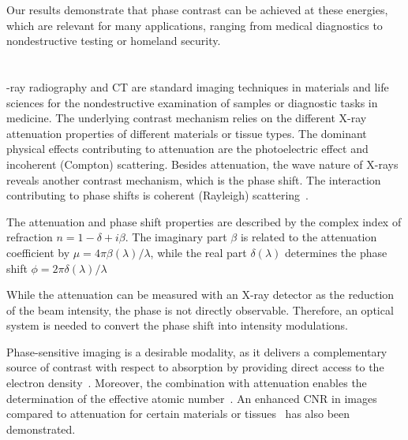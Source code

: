 \documentclass{pnastwo}
\begin{document}
\begin{article}
Our results demonstrate that phase contrast can be achieved at these
energies, which are relevant for many applications, ranging from medical
diagnostics to nondestructive testing or homeland security.

\section{}
-ray radiography and CT are standard imaging techniques in
materials and life sciences for the nondestructive examination of samples or
diagnostic tasks in medicine. The underlying contrast mechanism
relies on the different X-ray attenuation properties of different materials
or tissue types. The dominant physical effects contributing to attenuation
are the photoelectric effect and incoherent (Compton) scattering. Besides attenuation, the wave
nature of X-rays reveals another contrast mechanism, which is the phase
shift. The interaction contributing to phase shifts is coherent (Rayleigh)
scattering~\cite{Als-Nielsen2011}.

The attenuation and phase shift properties are described by the complex index of refraction
$n=1-\delta + i \beta$.
The imaginary part $\beta$ is related to the
attenuation coefficient by $\mu = 4 \pi
\beta(\lambda) / \lambda$, while the real part
$\delta(\lambda)$ determines the phase shift 
$\phi = 2 \pi \delta(\lambda) / \lambda$

While the attenuation can be measured with an
X-ray detector as the reduction of the beam intensity, the phase
is not directly observable. Therefore, an optical system is needed to
convert the phase shift into intensity modulations.

Phase-sensitive
imaging is a desirable modality, as it delivers a complementary source of
contrast with respect to absorption by providing direct access 
to the electron density~\cite{Als-Nielsen2011}. Moreover, the combination with
attenuation enables the determination of the effective atomic
number~\cite{Qi2010}.
An enhanced
CNR in images compared to attenuation for certain
materials or tissues~\cite{Pfeiffer2007a,McDonald2009} has also been
demonstrated.


\end{article}
\end{document}
